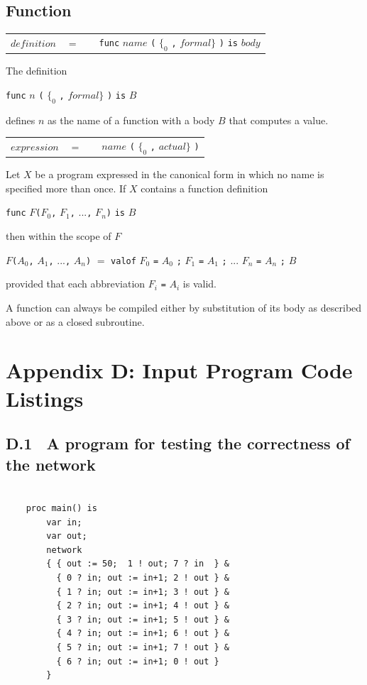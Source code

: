 \documentclass[a4paper, 12pt]{article}
\begin{document}
\subsection*{Function}

\begin{tabular}{llll}
$definition$    & $=$ && \verb|func| $name$ \verb|(| $\{_0$ \verb:,: $formal \}$ \verb|)| \verb|is| $body$\\
\end{tabular}   

The definition 

\verb|func| $n$ \verb|(| $\{_0$ \verb:,: $formal \}$ \verb|)| \verb|is| $B$

defines $n$ as the name of a function with a body $B$ that computes a value.

\begin{tabular}{llll}
$expression$    & $=$ &&$name$ \verb|(| $\{_0$ \verb:,: $actual \}$ \verb|)| 
\end{tabular}   

Let $X$ be a program expressed in the canonical form in which no name is specified more than once. If $X$
contains a function definition 

\verb|func| $F$\verb|(|$F_0$\verb|,| $F_1$\verb|,| ...\verb|,| $F_n$\verb|)| \verb|is| $B$

then within the scope of $F$

$F$\verb|(|$A_0$\verb|,| $A_1$\verb|,| ...\verb|,| $A_n$\verb|)| $=$ \verb|valof| $F_0$ \verb|=| $A_0$ \verb|;| $F_1$ \verb|=| $A_1$ \verb|;| ... $F_n$ \verb|=| $A_n$ \verb|;| $B$

provided that each abbreviation $F_i$ \verb|=| $A_i$ is valid. 

A function can always be compiled either by substitution of its body as described above or as a closed
subroutine.

\newpage
\section*{Appendix D: Input Program Code Listings}

\subsection*{D.1 \ A program for testing the correctness of the network}

\begin{lstlisting}

    proc main() is
        var in;
        var out;
        network 
        { { out := 50;  1 ! out; 7 ? in  } &
          { 0 ? in; out := in+1; 2 ! out } &
          { 1 ? in; out := in+1; 3 ! out } &
          { 2 ? in; out := in+1; 4 ! out } &
          { 3 ? in; out := in+1; 5 ! out } &
          { 4 ? in; out := in+1; 6 ! out } &
          { 5 ? in; out := in+1; 7 ! out } &
          { 6 ? in; out := in+1; 0 ! out } 
        }

\end{lstlisting}
\end{document}
